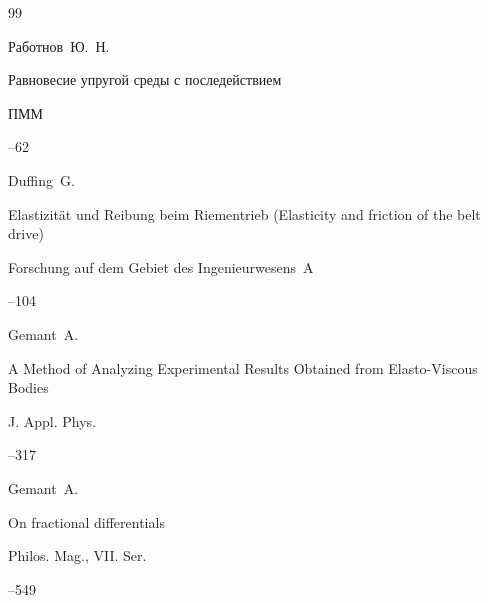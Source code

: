 \documentclass[11pt,a4paper,twoside]{article}
\begin{document}
\begin{thebibliography}{99}


\by Работнов~Ю.~Н.


\paper Равновесие упругой среды с последействием


\jour ПММ








--62









\by Duffing~G.


\paper Elastizit\"at und Reibung beim Riementrieb (Elasticity and friction of the belt drive)


\jour Forschung auf dem Gebiet des Ingenieurwesens~A






--104














\by Gemant~A.


\paper A Method of Analyzing Experimental Results Obtained from Elasto-Viscous Bodies 


\jour J. Appl. Phys.






--317









\by Gemant~A. 


\paper On fractional differentials


\jour Philos. Mag., VII. Ser.




--549 










\end{thebibliography}
\end{document}

